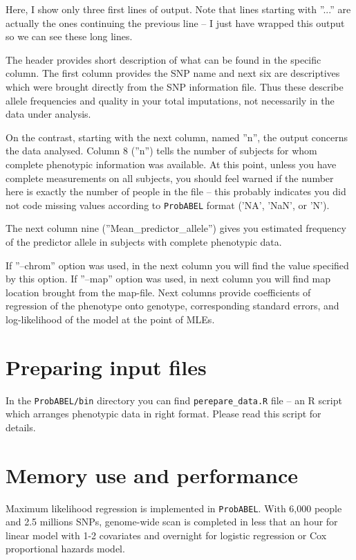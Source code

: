 \documentclass[12pt]{article}
\begin{document}
Here, I show only three first lines of output. Note that lines 
starting with ''...'' are actually the ones continuing the 
previous line -- I just have wrapped this output so we can see 
these long lines. 

The header provides short description of what can be found in the 
specific column. The first column provides the SNP name and 
next six are descriptives which were brought directly from the 
SNP information file. Thus these describe allele frequencies and 
quality in your total imputations, not necessarily in the data under 
analysis. 

On the contrast, starting with the next column, named ''n'', 
the output concerns the data analysed. Column 8 (''n'') tells the 
number of subjects for whom complete phenotypic information was available. 
At this point, unless you have complete measurements on all 
subjects, you should feel warned if the number here is exactly the 
number of people in the file -- this probably indicates you did not code 
missing values according to \texttt{ProbABEL} format ('NA', 'NaN', or 'N').

The next column nine (''Mean\_predictor\_allele'') gives you estimated 
frequency of the predictor allele in subjects with complete phenotypic data. 

If ''--chrom'' option was used, in the next column you will find the 
value specified by this option. If ''--map'' option was used, in next 
column you will find map location brought from the map-file. Next 
columns provide coefficients of regression  of the phenotype 
onto genotype, corresponding standard errors, and log-likelihood %
of the model at the point of MLEs.

\section{Preparing input files}

In the \texttt{ProbABEL/bin} directory you can find \texttt{perepare\_data.R}
file -- an R script which arranges phenotypic data in right format. 
Please read this script for details.

\section{Memory use and performance}

Maximum likelihood regression is implemented in \texttt{ProbABEL}. With 6,000 
people and 2.5 millions SNPs, genome-wide scan is completed in less 
that an hour for linear model with 1-2 covariates and overnight 
for logistic regression or Cox proportional hazards model.
\end{document}
